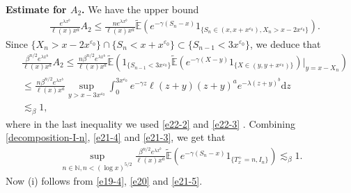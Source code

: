 \documentclass[11pt]{article}
\numberwithin{equation}{section}
\begin{document}
\noindent
{\bf Estimate for $A_2$.}
We have the upper bound
\begin{align} 
	& \frac{  e^{\lambda x^b}}{\ell(x) x^a } A_2  \leq  \frac{n e^{\lambda x^b}}{\ell(x) x^a } \widetilde{\mathbb{E}}\left(e^{-\gamma (S_n-x)}1_{\{S_n\in (x, x+x^{\varepsilon_0}),   X_n > x-2 x^{\varepsilon_0}\}}\right) .
\end{align}
Since $\{X_n>x-2x^{\varepsilon_0}\}\cap \{S_n < x+x^{\varepsilon_0}\}\subset \{S_{n-1}<3x^{\varepsilon_0}\}$, we deduce that 
\begin{align}\label{e21-3}
	& \frac{ \beta^{n/2} e^{\lambda x^b}}{\ell(x) x^a }  A_2 \leq  \frac{n \beta^{n/2}e^{\lambda x^b} }{\ell(x) x^a }\widetilde{\mathbb{E}}\left(1_{\{S_{n-1}<3x^{\varepsilon_0}\}} \widetilde{\mathbb{E}} \left(e^{-\gamma (X-y)}1_{\{X\in (y, y+x^{\varepsilon_0})  \}}\right)\big|_{y=x-X_n}\right)  \nonumber\\
	& \leq  \frac{n \beta^{n/2} e^{\lambda x^b}}{\ell(x) x^a }   \sup_{y>x-3x^{\varepsilon_0}} \int_0^{3x^{\varepsilon_0}} e^{-\gamma z} \ell(z+y) (z+y)^{a} e^{-\lambda (z+y)^b} \mathrm{d}z\nonumber\\
	&\lesssim_\beta 1,
\end{align}
where in the last inequality we used \eqref{e22-2} and \eqref{e22-3} . 
Combining \eqref{decomposition-I-n}, \eqref{e21-4} and \eqref{e21-3}, we get that 
\begin{align}\label{e21-5}
	\sup_{n\in \mathbb{N}, n< (\log x)^{5/2}}\frac{ \beta^{n/2}e^{\lambda x^b} }{\ell(x) x^a } \widetilde{\mathbb{E}}\left(e^{-\gamma (S_n-x)}1_{\{T_x^+=n, I_n\}}\right) \lesssim_\beta 1.
\end{align}
Now (i) follows from \eqref{e19-4}, \eqref{e20} and \eqref{e21-5}. 
\end{document}
